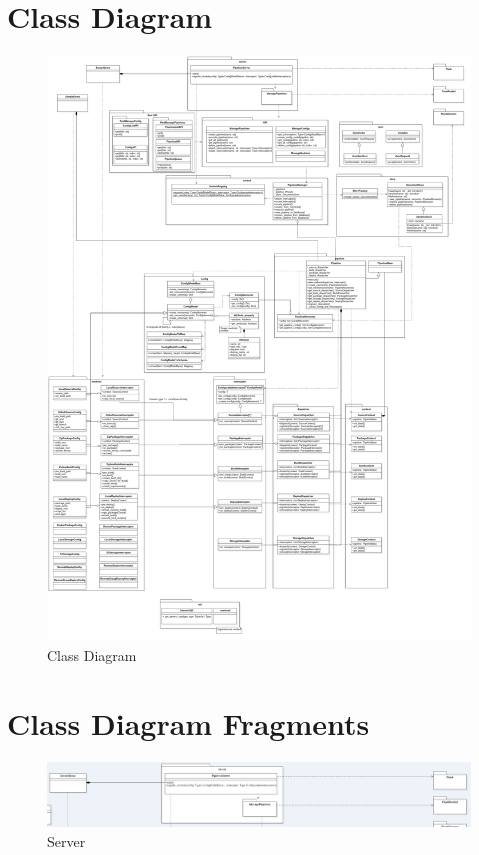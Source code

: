   \section{Class Diagram}
    \begin{figure}[H]
        \hspace{-4em}
        \includegraphics[width = 1.2\linewidth]{diagrams/architecture_classes.png}
        \caption{Class Diagram}
        \label{fig:architecture_classes}
      \end{figure}

    \section{Class Diagram Fragments}
    \begin{figure}[H]
    	\includegraphics[width = 1.2\linewidth]{diagrams/server.png}
    	\caption{Server}
    \end{figure}

